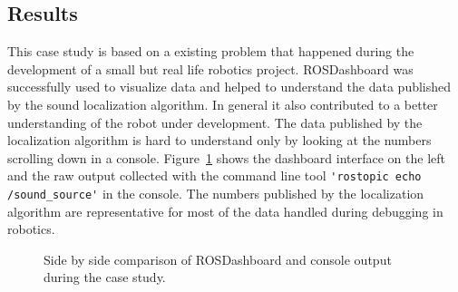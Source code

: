 \subsection{Results}
This case study is based on a existing problem that happened during the development of a small but real life robotics project. ROSDashboard was successfully used to visualize data and helped to understand the data published by the sound localization algorithm. In general it also contributed to a better understanding of the robot under development. The data published by the localization algorithm is hard to understand only by looking at the numbers scrolling down in a console. Figure~\ref{comparison} shows the dashboard interface on the left and the raw output collected with the command line tool \verb+'rostopic echo /sound_source'+ in the console. The numbers published by the localization algorithm are representative for most of the data handled during debugging in robotics.

\begin{figure}[ht]
\centering
{}
\caption{Side by side comparison of ROSDashboard and console output during the case study.}
\label{comparison}
\end{figure}
